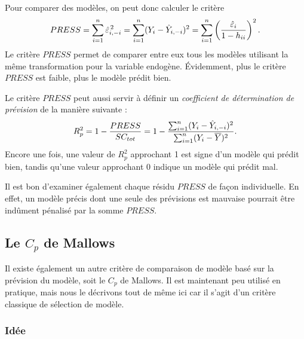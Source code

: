 Pour comparer des modèles, on peut donc calculer le critère
$$PRESS=\sum_{i=1}^n \hat\varepsilon_{i,-i}^{\,2} =\sum_{i=1}^n(Y_i-\hat{Y}_{i,-i})^2=\sum_{i=1}^n\left({\hat\varepsilon_i\over1-h_{ii}}\right)^2.$$
Le critère $PRESS$ permet de comparer entre eux tous les modèles utilisant la m\^eme transformation pour la variable endogène. \'Evidemment, plus le critère $PRESS$ est faible, plus le modèle prédit bien.

Le critère $PRESS$ peut aussi servir à définir un {\em coefficient de détermination de
prévision} de la manière suivante :
\begin{equation}\label{R^2prev}
R^2_{p}=1-{PRESS\over
SC_{tot}}=1-{\sum_{i=1}^n(Y_i-\hat{Y}_{i,-i})^2\over
\sum_{i=1}^n(Y_i-\overline{Y})^2}.
\end{equation}
Encore une fois, une valeur de $R^2_{p}$ approchant 1 est signe
d'un modèle qui prédit bien, tandis qu'une valeur approchant 0
indique un modèle qui prédit mal.

\begin{remarque}
Il est bon d'examiner également chaque résidu $PRESS$ de fa\c{c}on individuelle. En effet, un modèle précis dont une seule des prévisions est mauvaise pourrait être ind\^ument pénalisé par la somme $PRESS$.
\end{remarque}


\subsection{Le $C_p$ de Mallows}

Il existe également un autre critère de comparaison de modèle basé sur la prévision du modèle, soit le $C_p$ de Mallows. Il est maintenant peu utilisé en pratique, mais nous le décrivons tout de même ici car il s'agit d'un critère classique de sélection de modèle.

\label{sec:LeCpDeMallows}

\subsubsection{Idée}

